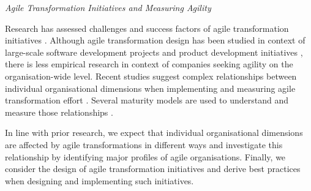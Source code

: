 \documentclass{article}
\newcommand{\myremark}[1]{{#1}}
\newcommand{\rmremark}[1]{\myremark{\color{red} [Ralf: #1]}}
\begin{document}
\textit{Agile Transformation Initiatives and Measuring Agility}

Research has assessed challenges and success factors of agile transformation initiatives \cite{dikert2016challenges}. Although agile transformation design has been studied in context of large-scale software development projects \cite{Alqudah2016} and product development initiatives \cite{Kettunen2008}, there is less empirical research in context of companies seeking agility on the organisation-wide level. Recent studies suggest complex relationships between individual organisational dimensions when implementing and measuring agile transformation effort \cite{Kettunen2008}. Several maturity models are used to understand and measure those relationships \cite{wendler2013, gren2015}.

In line with prior research, we expect that individual organisational dimensions are affected by agile transformations in different ways and investigate this relationship by identifying major profiles of agile organisations. Finally, we consider the design of agile transformation initiatives and derive best practices when designing and implementing such initiatives.











\end{document}
